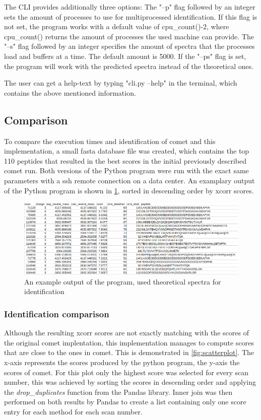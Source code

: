 \documentclass[11pt]{article}
\begin{document}
The CLI provides additionally three options: The "--p" flag followed by an integer sets the amount of processes to use for multiprocessed identification. If this flag is not set, the program works with a default value of cpu\_count()-2, where cpu\_count() returns the amount of processes the used machine can provide. The "--s" flag followed by an integer specifies the amount of spectra that the processes load and buffers at a time. The default amount is 5000. If the "--ps" flag is set, the program will work with the predicted spectra instead of the theoretical ones.

The user can get a help-text by typing "cli.py --help" in the terminal, which contains the above mentioned information.

\subsection{Comparison}
To compare the execution times and identification of comet and this implementation, a small fasta database file was created, which contains the top 110 peptides that resulted in the best scores in the initial previously described comet run. Both versions of the Python program were run with the exact same parameters with a ssh remote connection on a data center.
An examplary output of the Python program is shown in \cref{fig:output}, sorted in descending order by xcorr scores.
\begin{figure}[ht]
\centering
\includegraphics[width=1\textwidth]{figs/output.png}
\caption{An example output of the program, used theoretical spectra for identification}
\label{fig:output}
\end{figure}

\subsubsection{Identification comparison}
Although the resulting xcorr scores are not exactly matching with the scores of the original comet implentation, this implementation manages to compute scores that are close to the ones in comet. This is demonstrated in \cref{fig:scatterplot}. The x-axis represents the scores produced by the python program, the y-axis the scores of comet. For this plot only the highest score was selected for every scan number, this was achieved by sorting the scores in descending order and applying the \textit{drop\_duplicates} function from the Pandas library. Inner join was then performed on both results by Pandas to create a list containing only one score entry for each method for each scan number. 
\end{document}
